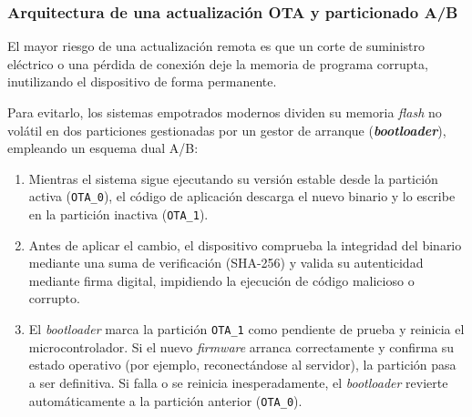 \documentclass[../main.tex]{subfiles}
\begin{document}
            \subsubsection{Arquitectura de una actualización OTA y particionado A/B}
                El mayor riesgo de una actualización remota es que un corte de suministro eléctrico o una pérdida de conexión deje la memoria de programa corrupta, inutilizando el dispositivo de forma permanente.

                Para evitarlo, los sistemas empotrados modernos dividen su memoria \emph{flash} no volátil en dos particiones gestionadas por un gestor de arranque (\textbf{\emph{bootloader}}), empleando un esquema dual A/B:

                \begin{enumerate}
                    \item Mientras el sistema sigue ejecutando su versión estable desde la partición activa (\texttt{OTA\_0}), el código de aplicación descarga el nuevo binario y lo escribe en la partición inactiva (\texttt{OTA\_1}).
                    \item Antes de aplicar el cambio, el dispositivo comprueba la integridad del binario mediante una suma de verificación (SHA-256) y valida su autenticidad mediante firma digital, impidiendo la ejecución de código malicioso o corrupto.
                    \item El \emph{bootloader} marca la partición \texttt{OTA\_1} como pendiente de prueba y reinicia el microcontrolador. Si el nuevo \emph{firmware} arranca correctamente y confirma su estado operativo (por ejemplo, reconectándose al servidor), la partición pasa a ser definitiva. Si falla o se reinicia inesperadamente, el \emph{bootloader} revierte automáticamente a la partición anterior (\texttt{OTA\_0}).
                \end{enumerate}
\end{document}
